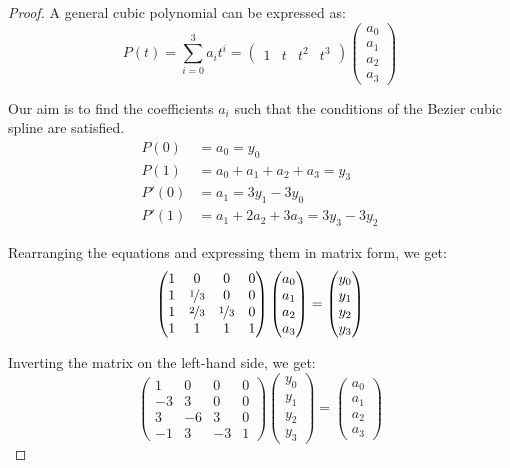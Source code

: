 \begin{proof}
    A general cubic polynomial can be expressed as:
    \[P(t) = \sum_{i=0}^{3} a_i t^i
    = \begin{pmatrix}
        1 & t & t^2 & t^3
    \end{pmatrix}
    \begin{pmatrix}
        a_0 \\ a_1 \\ a_2 \\ a_3
    \end{pmatrix}\]

    Our aim is to find the coefficients $a_i$ such that the conditions of the Bezier cubic spline are satisfied.
    \begin{align*}
        P(0) &= a_0 = y_0 \\
        P(1) &= a_0 + a_1 + a_2 + a_3 = y_3 \\
        P'(0) &= a_1 = 3y_1 - 3y_0 \\
        P'(1) &= a_1 + 2a_2 + 3a_3 = 3y_3 - 3y_2
    \end{align*}

    Rearranging the equations and expressing them in matrix form, we get:
    \[\begin{pmatrix}
    1 & 0 & 0 & 0 \\
    1 & \nicefrac{1}{3} & 0 & 0 \\
    1 & \nicefrac{2}{3} & \nicefrac{1}{3} & 0 \\
    1 & 1 & 1 & 1
    \end{pmatrix}
    \begin{pmatrix}
        a_0 \\ a_1 \\ a_2 \\ a_3
    \end{pmatrix} =
    \begin{pmatrix}
        y_0 \\ y_1 \\ y_2 \\ y_3
    \end{pmatrix}\]

    Inverting the matrix on the left-hand side, we get:
    \[\begin{pmatrix}
    1 & 0 & 0 & 0 \\
    -3 & 3 & 0 & 0 \\
    3 & -6 & 3 & 0 \\
    -1 & 3 & -3 & 1
    \end{pmatrix}
    \begin{pmatrix}
        y_0 \\ y_1 \\ y_2 \\ y_3
    \end{pmatrix} =
    \begin{pmatrix}
        a_0 \\ a_1 \\ a_2 \\ a_3
    \end{pmatrix}\]


\end{proof}

